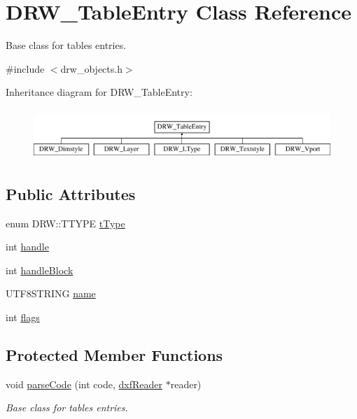 \hypertarget{classDRW__TableEntry}{\section{D\-R\-W\-\_\-\-Table\-Entry Class Reference}
\label{classDRW__TableEntry}
}


Base class for tables entries.  




{\ttfamily \#include $<$drw\-\_\-objects.\-h$>$}

Inheritance diagram for D\-R\-W\-\_\-\-Table\-Entry\-:\begin{figure}[H]
\begin{center}
\leavevmode
\includegraphics[height=1.931034cm]{classDRW__TableEntry}
\end{center}
\end{figure}
\subsection*{Public Attributes}
\begin{DoxyCompactItemize}
\item 
enum D\-R\-W\-::\-T\-T\-Y\-P\-E \hyperlink{classDRW__TableEntry_a4ceb84db2231dcc1c3070e5825966a0d}{t\-Type}
\item 
int \hyperlink{classDRW__TableEntry_a9aefd859bd8a3d423f53623f8f089ac3}{handle}
\item 
int \hyperlink{classDRW__TableEntry_a91713970d0eec5baf8aa16b8c5556ce7}{handle\-Block}
\item 
U\-T\-F8\-S\-T\-R\-I\-N\-G \hyperlink{classDRW__TableEntry_a854ab48893457e607ac13425304415b4}{name}
\item 
int \hyperlink{classDRW__TableEntry_a45931e761e264e52857687067029e6a8}{flags}
\end{DoxyCompactItemize}
\subsection*{Protected Member Functions}
\begin{DoxyCompactItemize}
\item 
void \hyperlink{classDRW__TableEntry_ae342918d8e3005bd640762de9d52dbde}{parse\-Code} (int code, \hyperlink{classdxfReader}{dxf\-Reader} $\ast$reader)
\begin{DoxyCompactList}\small\item\em Base class for tables entries. \end{DoxyCompactList}\end{DoxyCompactItemize}


